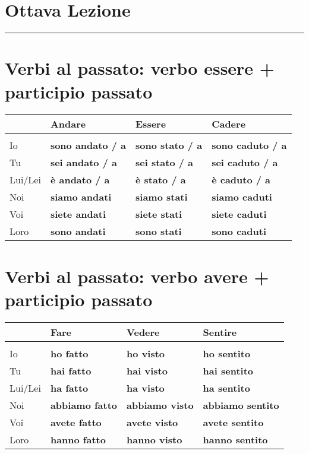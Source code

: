 \documentclass[letter,11pt]{article}
\begin{document}
\section*{\Large{Ottava Lezione}}
\noindent\rule{16cm}{1pt}

\setlength{\parindent}{260pt}

\vskip 0.2in
\section*{Verbi al passato: verbo essere + participio passato}
\vskip 0.2in

\begin{tabular}{ |p{2cm}| p{3cm}| p{3cm}| p{3cm}| }
      & Andare & Essere & Cadere  \\
    \hline
    \hline
     &  &  &  \\ \hline
    Io      & {\bf sono andato / a} & {\bf sono stato / a} & {\bf sono caduto / a}  \\ \hline
    Tu      & {\bf sei andato / a} & {\bf sei stato / a} & {\bf sei caduto / a}   \\ \hline
    Lui/Lei & {\bf è andato / a} & {\bf è stato / a} & {\bf è caduto / a}    \\ \hline
    Noi     & {\bf siamo andati} & {\bf siamo stati} & {\bf siamo caduti} \\ \hline
    Voi     & {\bf siete andati} & {\bf siete stati} & {\bf siete caduti} \\ \hline
    Loro    & {\bf sono andati} & {\bf sono stati} & {\bf sono caduti}\\ \hline
    \hline
\end{tabular}

\vskip 0.2in
\section*{Verbi al passato: verbo avere + participio passato}
\vskip 0.2in

\begin{tabular}{ |p{2cm}| p{4cm}| p{4cm}| p{4cm}| }
      & Fare  & Vedere & Sentire  \\
    \hline
    \hline
     &  &  & \\ \hline
    Io      & {\bf ho fatto}      & {\bf ho visto}     &  {\bf ho sentito} \\ \hline
    Tu      & {\bf hai fatto}     & {\bf hai visto}  &  {\bf hai sentito}  \\ \hline
    Lui/Lei & {\bf ha fatto}      & {\bf ha visto}   &  {\bf ha sentito}\\ \hline
    Noi     & {\bf abbiamo fatto} & {\bf abbiamo visto} & {\bf abbiamo sentito} \\ \hline
    Voi     & {\bf avete fatto}   & {\bf avete visto}   &  {\bf avete sentito}  \\ \hline
    Loro    & {\bf hanno fatto}   & {\bf hanno visto}   &  {\bf hanno sentito}  \\ \hline
    \hline
\end{tabular}
\end{document}

